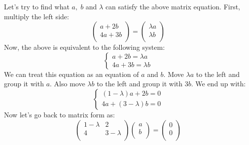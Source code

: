 \documentclass[12pt]{report}
\begin{document}
Let's try to find what $a, \; b$ and $\lambda$ can satisfy the above matrix equation. First, multiply the left side:
$$\begin{pmatrix} a+2b \\ 4a+ 3b\\ \end{pmatrix} =  \begin{pmatrix} \lambda a \\ \lambda b\\ \end{pmatrix} $$
Now, the above is equivalent to the following system:
$$\begin{cases} a+2b=\lambda a  \\ 4a+ 3b= \lambda b \end{cases}$$
We can treat this equation as an equation of $a$ and $b$. Move $\lambda a$ to the left and group it with $a$. Also move $\lambda b$ to the left and group it with $3b$. We end up with:
$$\begin{cases} (1-\lambda)a+2b =0  \\ 4a+ (3-\lambda)b= 0 \end{cases}$$
Now let's go back to matrix form as:
$$\begin{pmatrix} 1- \lambda &2 \\ 4& 3- \lambda\\ \end{pmatrix} \begin{pmatrix} a \\ b\\ \end{pmatrix} =  \begin{pmatrix} 0 \\ 0\\ \end{pmatrix} $$
\end{document}
